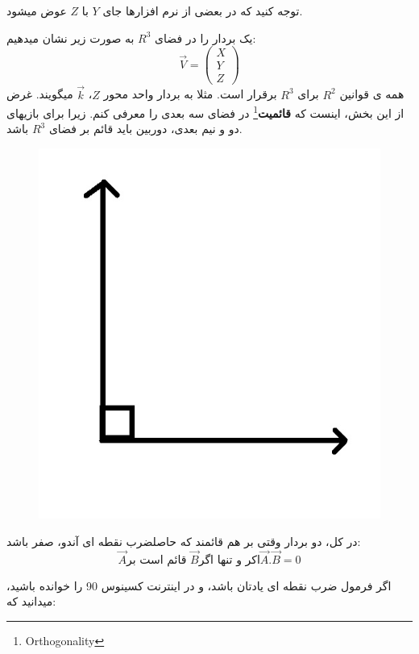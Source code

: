 \documentclass[14pt,a4paper]{memoir}
\begin{document}
	 توجه کنید که در بعضی از نرم افزارها جای $  Y $ با $ Z $ عوض میشود.
	 
	یک بردار را در فضای $ R^3 $ به صورت زیر نشان میدهیم:
\[  \vec{V} = \begin{pmatrix}
X \\
Y \\
Z
\end{pmatrix}  \]
	 همه ی قوانین $ R^2 $ برای  $ R^3 $ برقرار است. مثلا به بردار واحد محور $ Z $، $ \vec{k} $ میگویند. غرض از این بخش، اینست که \textbf{قائمیت}\footnote{ Orthogonality} در فضای سه بعدی را معرفی کنم. زیرا برای بازیهای دو و نیم بعدی، دوربین باید قائم بر فضای $ R^3 $ باشد.
	 
	 

	 \begin{figure}[H]
	 	\centering
	 		\includegraphics[scale=0.3]{Orthogonal}
	 \end{figure}

	 در کل، دو بردار وقتی بر هم قائمند که حاصلضرب نقطه ای آندو، صفر باشد:
	 \[ \vec{A} \text{قائم است بر } \vec{B} \text{اکر و تنها اگر} \vec{A}.\vec{B} = 0 \]  
	 
	 اگر فرمول ضرب نقطه ای یادتان باشد، و در اینترنت کسینوس 90 را خوانده باشید، میدانید که:
	 
\end{document}
